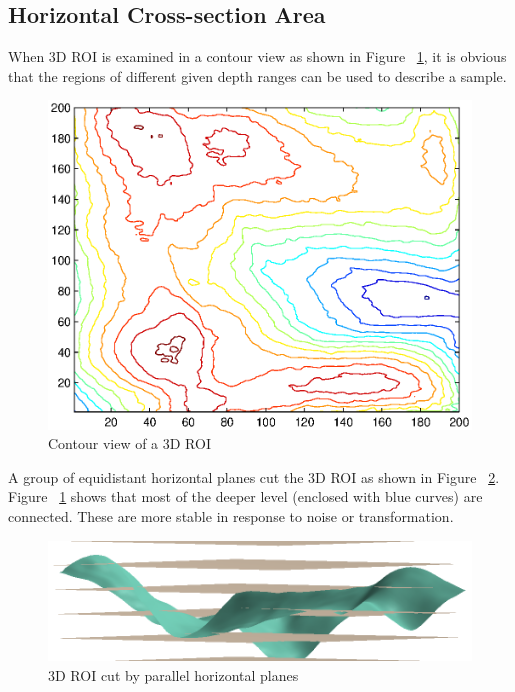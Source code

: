 \subsection{Horizontal Cross-section Area}
\label{ssec:methodology:hca}

When 3D ROI is examined in a contour view as shown in Figure ~\ref{fig:methodology:roicontour}, it is obvious that the regions of different given depth ranges can be used to describe a sample.

\begin{figure}[htb]
\begin{center}
\includegraphics[width=0.9\linewidth]{ch-methodology/figures/roicontour}
\caption[Contour view of a 3D ROI]{Contour view of a 3D ROI}
\label{fig:methodology:roicontour}
\end{center}
\end{figure}

A group of equidistant horizontal planes cut the 3D ROI as shown in Figure ~\ref{fig:methodology:planecut}. Figure ~\ref{fig:methodology:roicontour} shows that most of the deeper level (enclosed with blue curves) are connected. These are more stable in response to noise or transformation.

\begin{figure}[htb]
\begin{center}
\includegraphics[width=0.9\linewidth]{ch-methodology/figures/planecut}
\caption[3D ROI cut by parallel horizontal planes]{3D ROI cut by parallel horizontal planes}
\label{fig:methodology:planecut}
\end{center}
\end{figure}


